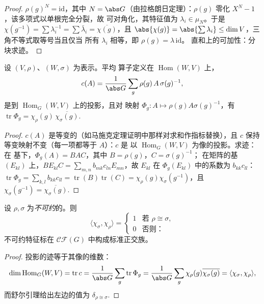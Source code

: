 \begin{proof}
$\rho(g)^N = \mathrm{id}$，其中 $N = \abs G$（由拉格朗日定理）：$\rho(g)$
零化 $X^N - 1$，该多项式以单根完全分裂，故
可对角化，其特征值为 $\lambda_i \in \mu_N$。于是
$\chi(g^{-1}) = \sum \lambda_i^{-1} = \sum\bar\lambda_i =
\overline{\chi(g)}$，且 $\abs{\chi(g)} = \abs{\sum\lambda_i}
\leq \dim V$，三角不等式取等号当且仅当
所有 $\lambda_i$ 相等，即 $\rho(g) = \lambda\,\mathrm{id}$。
直和上的可加性：分块求迹。
\end{proof}

\begin{lemma}\label{lem:b3:representations:homtrace}
设 $(V, \rho)$、$(W, \sigma)$ 为表示。平均
算子定义在 $\operatorname{Hom}(W, V)$ 上，
\[
c(A) = \frac1{\abs G}\sum_{g}\rho(g)\,A\,\sigma(g)^{-1},
\]
是到 $\operatorname{Hom}_G(W, V)$ 上的投影，且对
映射 $\Phi_g \colon A \mapsto \rho(g)A\sigma(g)^{-1}$，有
$\operatorname{tr}\Phi_g =
\chi_\rho(g)\,\overline{\chi_\sigma(g)}$.
\end{lemma}

\begin{proof}
$c(A)$ 是等变的（如马施克定理证明中那样对求和作指标替换），且 $c$
保持等变映射不变（每一项都等于 $A$）：$c$ 是
以 $\operatorname{Hom}_G(W, V)$ 为像的投影。求迹：在
基下，$\Phi_g(A) = BAC$，其中 $B = \rho(g)$，$C = \sigma(g)^{-1}$；
在矩阵的基 $(E_{kl})$ 上，$BE_{kl}C = \sum_{m,n}
b_{mk}c_{ln}E_{mn}$，故 $E_{kl}$ 在
$\Phi_g(E_{kl})$ 中的系数为 $b_{kk}c_{ll}$：$\operatorname{tr}\Phi_g =
\sum_{k,l}b_{kk}c_{ll} = \operatorname{tr}(B)
\operatorname{tr}(C) = \chi_\rho(g)\chi_\sigma(g^{-1})$，且
$\chi_\sigma(g^{-1}) = \overline{\chi_\sigma(g)}$.
\end{proof}

\begin{theorem}[第一正交关系]
\label{thm:b3:representations:orthogonality}
设 $\rho, \sigma$ 为\emph{不可约}的。则
\[
\langle\chi_\sigma, \chi_\rho\rangle =
\begin{cases}
1 & \text{若 } \rho \cong \sigma,\\
0 & \text{否则：}
\end{cases}
\]
不可约特征标在
$\mathcal{CF}(G)$ 中构成标准正交族。
\end{theorem}

\begin{proof}
投影的迹等于其像的维数：
\[
\dim\operatorname{Hom}_G(W, V) = \operatorname{tr} c
= \frac1{\abs G}\sum_g \operatorname{tr}\Phi_g
= \frac1{\abs G}\sum_g \chi_\rho(g)\overline{\chi_\sigma(g)}
= \langle \chi_\sigma, \chi_\rho\rangle,
\]
而舒尔引理给出左边的值为 $\delta_{\rho \cong
\sigma}$.
\end{proof}


